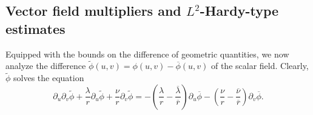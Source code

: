 \documentclass[10pt, reqno]{amsart}
\theoremstyle{definition}
\theoremstyle{remark}
\theoremstyle{conjecture}
\numberwithin{equation}{section}
\newcommand{\rd}{\partial}
\newcommand{\bb}{\Big}
\newcommand{\0}{\emptyset}
\newcommand{\dlt}{\delta}
\newcommand{\lmb}{\lambda}
\newcommand{\dur}{\nu}
\newcommand{\dvr}{\lmb}
\newcommand{\phibg}{\overline{\phi}}				%
\newcommand{\dvrbg}{\overline{\dvr}}				%
\newcommand{\durbg}{\overline{\dur}}				%
\newcommand{\rbg}{\overline{r}}					%
\newcommand{\phidf}{\widetilde{\phi}}				%
\begin{document}
\subsection{Vector field multipliers and $L^{2}$-Hardy-type estimates} \label{subsec:en-id}
Equipped with the bounds on the difference of geometric quantities, we now analyze the difference $\phidf (u, v) = \phi(u,v) - \phibg(u, v)$ of the scalar field. Clearly, $\phidf$ solves the equation
\begin{equation} \label{eq:wave4phidf}
	\rd_{u} \rd_{v} \phidf + \frac{\dvr}{r} \rd_{u} \phidf + \frac{\dur}{r} \rd_{v} \phidf 
	= - \left( \frac{\dvr}{r} - \frac{\dvrbg}{\rbg} \right) \rd_{u} \phibg - \left( \frac{\dur}{r} - \frac{\durbg}{\rbg} \right) \rd_{v} \phibg.
\end{equation}
\end{document}
